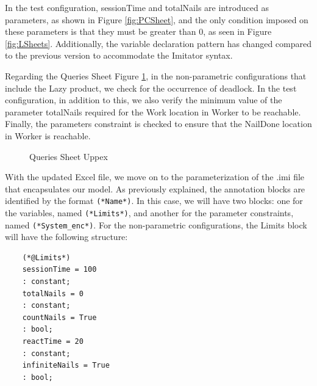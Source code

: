 In the test configuration, sessionTime and totalNails are introduced as parameters, as shown in Figure \ref{fig:PCSheet}, and the only condition imposed on these parameters is that they must be greater than 0, as seen in Figure \ref{fig:LSheets}. Additionally, the variable declaration pattern has changed compared to the previous version to accommodate the Imitator syntax.

Regarding the Queries Sheet Figure \ref{fig:cof_q}, in the non-parametric configurations that include the Lazy product, we check for the occurrence of deadlock. In the test configuration, in addition to this, we also verify the minimum value of the parameter totalNails required for the Work location in Worker to be reachable. Finally, the parameters constraint is checked to ensure that the NailDone location in Worker is reachable.


\begin{figure}[H]
    \centering
    \begin{minipage}{\textwidth}
        \centering
        \caption{Queries Sheet Uppex}
        \label{fig:cof_q}
    \end{minipage}
\end{figure}

With the updated Excel file, we move on to the parameterization of the .imi file that encapsulates our model. As previously explained, the annotation blocks are identified by the format \texttt{(*Name*)}. In this case, we will have two blocks: one for the variables, named \texttt{(*Limits*)}, and another for the parameter constraints, named \texttt{(*System\_enc*)}. For the non-parametric configurations, the Limits block will have the following structure:

\begin{verbatim}
    (*@Limits*)
    sessionTime = 100
    : constant;
    totalNails = 0
    : constant;
    countNails = True
    : bool;
    reactTime = 20
    : constant;
    infiniteNails = True
    : bool;
\end{verbatim}

